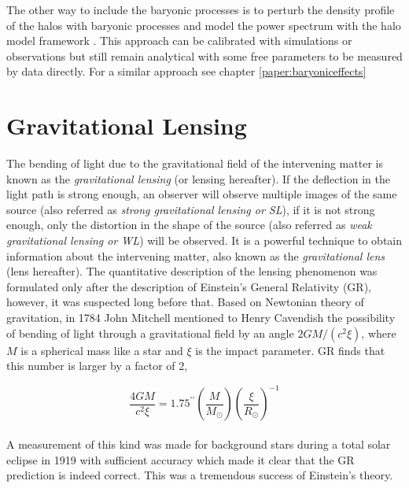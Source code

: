 The other way to include the baryonic processes is to perturb the density profile 
of the halos with baryonic processes and model the power spectrum with the halo model framework 
\cite{2014arXiv1410.6826M}.  This approach can 
be calibrated with simulations or observations but still remain analytical with some 
free parameters to be measured by data directly. 
For a similar approach see chapter \ref{paper:baryoniceffects}



\clearpage
\section{Gravitational Lensing}
The bending of light due to the gravitational field of the intervening matter is known as
the {\it gravitational lensing} (or lensing hereafter). If the deflection in the light
path is strong enough, an observer will observe multiple images of the same source 
(also referred as {\it strong gravitational lensing or SL}), 
if it is not strong enough, only the distortion in the shape of the source  
(also referred as {\it weak gravitational lensing or WL}) will be observed. It is a powerful technique to 
obtain information about the intervening matter, also known as the {\it gravitational
lens} (lens hereafter). The quantitative description of the lensing phenomenon
was formulated only after the description of Einstein's General Relativity (GR), however,
it was suspected long before that. Based on Newtonian theory of gravitation, in 1784 
John Mitchell mentioned to Henry Cavendish the possibility of bending of light
through a gravitational field by an angle $ 2GM/(c^2 \xi)$, where $M$ is a spherical
mass like a star and $\xi$ is the impact parameter. GR finds that this number is larger 
by a factor of 2,

\begin{equation}
	\dfrac{4GM}{c^2 \xi} = 1.75^{\prime \prime} 
					\left(\dfrac{M}{M_{\odot}}\right)
					\left(\dfrac{\xi}{R_{\odot}} \right)^{-1}
\end{equation}
\\
A measurement of this kind was made for background stars during a total solar eclipse
in 1919 with sufficient accuracy which made it clear that the GR prediction is indeed
correct. This was a tremendous success of Einstein's theory. 

